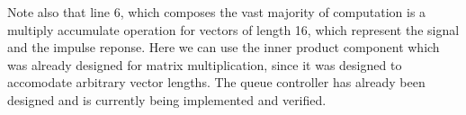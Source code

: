 Note also that line 6, which composes the vast majority of computation is a multiply accumulate operation for vectors of length 16, which represent the signal and the impulse reponse.  Here we can use the inner product component which was already designed for matrix multiplication, since it was designed to accomodate arbitrary vector lengths.  The queue controller has already been designed and is currently being implemented and verified.
